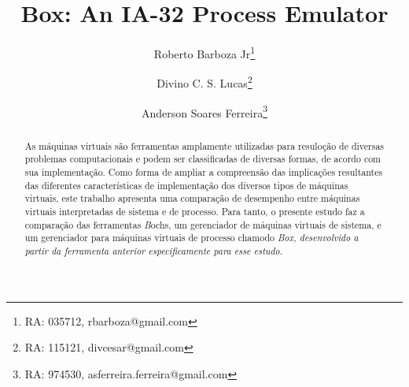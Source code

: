 \documentclass[11pt,twoside]{article}
\begin{document}
% 

%



\TRMakeCover


%
\pagestyle{myheadings}

%
\title{Box: An IA-32 Process Emulator}

\author{Roberto Barboza Jr\thanks{RA: 035712, rbarboza@gmail.com} \and
Divino C. S. Lucas\thanks{RA: 115121, divcesar@gmail.com} \and
Anderson Soares Ferreira\thanks{RA: 974530, asferreira.ferreira@gmail.com}}

\date{}

\maketitle


\begin{abstract} 
 As máquinas virtuais são ferramentas amplamente utilizadas para resuloção de diversas problemas computacionais e podem ser classificadas de diversas formas, de acordo com sua implementação.
 Como forma de ampliar a compreensão das implicações resultantes das diferentes características de implementação dos diversos tipos de máquinas virtuais, este trabalho apresenta uma comparação de desempenho entre máquinas virtuais interpretadas de sistema e de processo.
 Para tanto, o presente estudo faz a comparação das ferramentas {\emph Bochs}, um gerenciador de máquinas virtuais de sistema, e um gerenciador para máquinas virtuais de processo chamodo \em{Box}, desenvolvido a partir da ferramenta anterior especificamente para esse estudo.
\end{abstract}
\end{document}
